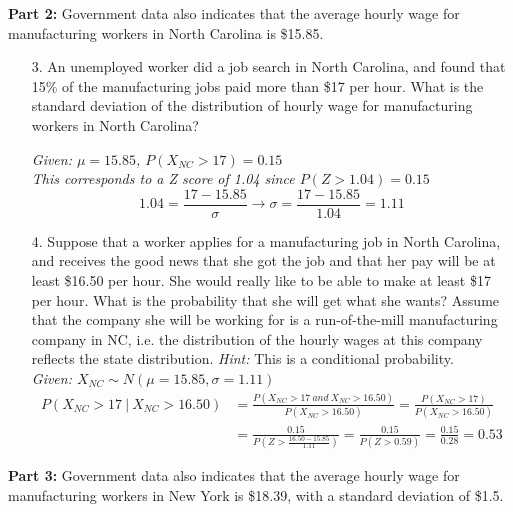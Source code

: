 \documentclass[12pt]{article}
\newcommand{\soln}[2]{\textit{\textcolor{custom_red}{#2}}}{}
\begin{document}
\pagebreak

\textbf{Part 2:}
Government data also indicates that the average hourly wage for manufacturing workers in North Carolina is \$15.85. 

\begin{enumerate}

\item[3.] An unemployed worker did a job search in North Carolina, and found that 15\% of the manufacturing jobs paid 
more than \$17 per hour. What is the standard deviation of the distribution of hourly wage for manufacturing workers in 
North Carolina?

\soln{4cm}{
Given: $\mu = 15.85$, $P(X_{NC} > 17) = 0.15$ \\
This corresponds to a Z score of 1.04 since $P(Z > 1.04) = 0.15$ 
\[ 1.04 = \frac{17 - 15.85}{\sigma} \rightarrow \sigma = \frac{17 - 15.85}{1.04} = 1.11 \]
}

\item[4.] Suppose that a worker applies for a manufacturing job in North Carolina, and receives the good news that she 
got the job and that her pay will be at least \$16.50 per hour. She would really like to be able to make at least \$17 per 
hour. What is the probability that she will get what she wants? Assume that the company she will be working for is a 
run-of-the-mill manufacturing company in NC, i.e. the distribution of the hourly wages at this company reflects the state 
distribution. \textit{Hint:} This is a conditional probability. \\

\soln{6cm}{
Given: $X_{NC} \sim N(\mu = 15.85, \sigma = 1.11)$
\begin{align*}
P(X_{NC} > 17 ~|~ X_{NC} > 16.50) &= \frac{P(X_{NC} > 17 ~and~ X_{NC} > 16.50)}{P(X_{NC} > 16.50)} = \frac{P(X_{NC} > 17)}{P(X_{NC} > 16.50)} \\
&= \frac{0.15}{P\left( Z > \frac{16.50 - 15.85}{1.11} \right)} = \frac{0.15}{P(Z > 0.59)} = \frac{0.15}{0.28} = 0.53
\end{align*}
}

\end{enumerate}

\pagebreak

\textbf{Part 3:}
Government data also indicates that the average hourly wage for manufacturing workers in New York is \$18.39, with a 
standard deviation of \$1.5. 
\end{document}

